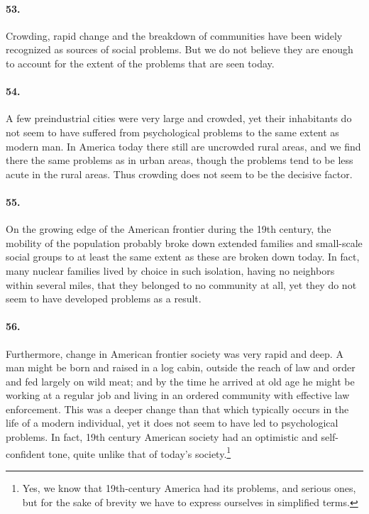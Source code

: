\documentclass[12pt]{book}
\begin{document}
\paragraph{53.} Crowding, rapid change and the breakdown of communities have been widely recognized as sources of social problems. But we do not believe they are enough to account for the extent of the problems that are seen today.


\paragraph{54.} A few preindustrial cities were very large and crowded, yet their inhabitants do not seem to have suffered from psychological problems to the same extent as modern man. In America today there still are uncrowded rural areas, and we find there the same problems as in urban areas, though the problems tend to be less acute in the rural areas. Thus crowding does not seem to be the decisive factor.


\paragraph{55.}  On the growing edge of the American frontier during the 19th century, the mobility of the population probably broke down extended families and small-scale social groups to at least the same extent as these are broken down today. In fact, many nuclear families lived by choice in such isolation, having no neighbors within several miles, that they belonged to no community at all, yet they do not seem to have developed problems as a result.


\paragraph{56.} Furthermore, change in American frontier society was very rapid and deep. A man might be born and raised in a log cabin, outside the reach of law and order and fed largely on wild meat; and by the time he arrived at old age he might be working at a regular job and living in an ordered community with effective law enforcement. This was a deeper change than that which typically occurs in the life of a modern individual, yet it does not seem to have led to psychological problems. In fact, 19th century American society had an optimistic and self-confident tone, quite unlike that of today's society.\footnote{Yes, we know that 19th-century America had its problems, and serious ones, but for the sake of brevity we have to express ourselves in simplified terms.}
\end{document}

